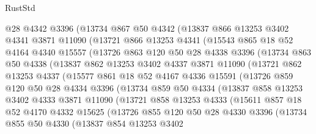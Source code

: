 \begin{lexlean}{RustStd}
\begin{coremodule}
    @28
    @4342
    @3396
    (@13734
      @867
      @50
      @4342
      (@13837
        @866
        @13253
        @3402
        @4341
        @3871
        @11090
        (@13721
          @866
          @13253
          @4341
          (@15543
            @865
            @18
            @52
            @4164
            @4340
            @15557
            (@13726
              @863
              @120
              @50
              @28
              @4338
              @3396
              (@13734
                @863
                @50
                @4338
                (@13837
                  @862
                  @13253
                  @3402
                  @4337
                  @3871
                  @11090
                  (@13721
                    @862
                    @13253
                    @4337
                    (@15577
                      @861
                      @18
                      @52
                      @4167
                      @4336
                      @15591
                      (@13726
                        @859
                        @120
                        @50
                        @28
                        @4334
                        @3396
                        (@13734
                          @859
                          @50
                          @4334
                          (@13837
                            @858
                            @13253
                            @3402
                            @4333
                            @3871
                            @11090
                            (@13721
                              @858
                              @13253
                              @4333
                              (@15611
                                @857
                                @18
                                @52
                                @4170
                                @4332
                                @15625
                                (@13726
                                  @855
                                  @120
                                  @50
                                  @28
                                  @4330
                                  @3396
                                  (@13734
                                    @855
                                    @50
                                    @4330
                                    (@13837
                                      @854
                                      @13253
                                      @3402

\end{coremodule}
\end{lexlean}
